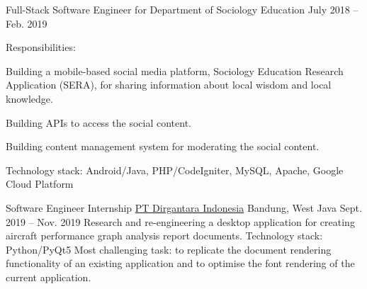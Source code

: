 \begin{cventries}

\cventry
{Full-Stack Software Engineer for Department of Sociology Education} %
{} %
{} %
{July 2018 -- Feb. 2019} %
{ %
Responsibilities:
\vspace{5mm}
\begin{cvitems}
\item {Building a mobile-based social media platform, Sociology Education Research Application (SERA), for sharing information about local wisdom and local knowledge.}
\item {Building APIs to access the social content.}
\item {Building content management system for moderating the social content.}
\end{cvitems}
\vspace{4mm}
Technology stack: Android/Java, PHP/CodeIgniter, MySQL, Apache, Google Cloud Platform
}




\cventry
{Software Engineer Internship} %
{\href{https://www.indonesian-aerospace.com/}{PT Dirgantara Indonesia}} %
{Bandung, West Java} %
{Sept. 2019 -- Nov. 2019} %
{ %
Research and re-engineering a desktop application for creating aircraft performance graph analysis report documents.
\linebreak
Technology stack: Python/PyQt5
\linebreak
Most challenging task: to replicate the document rendering functionality of an existing application and to optimise the font rendering of the current application.
}


\end{cventries}
